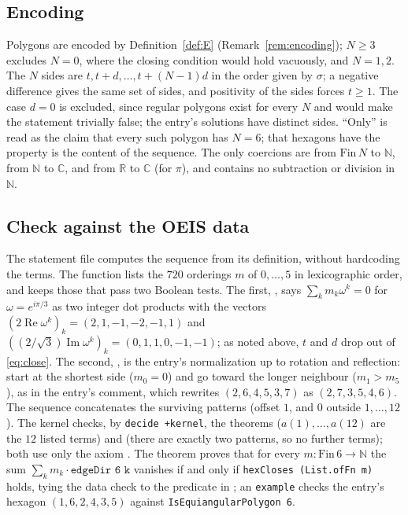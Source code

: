 \documentclass[11pt]{amsart}
\theoremstyle{plain}
\theoremstyle{definition}
\newcommand{\N}{\mathbb{N}}
\newcommand{\C}{\mathbb{C}}
\begin{document}
\subsection*{Encoding}
Polygons are encoded by Definition~\ref{def:E} (Remark~\ref{rem:encoding}); $N\ge3$ excludes $N=0$, where the closing condition would hold vacuously, and $N=1,2$.
The $N$ sides are $t,t+d,\dots,t+(N-1)d$ in the order given by $\sigma$; a negative difference gives the same set of sides, and positivity of the sides forces $t\ge1$.
The case $d=0$ is excluded, since regular polygons exist for every $N$ and would make the statement trivially false; the entry's solutions have distinct sides.
``Only'' is read as the claim that every such polygon has $N=6$; that hexagons have the property is the content of the sequence.
The only coercions are from $\mathrm{Fin}\,N$ to $\N$, from $\N$ to $\C$, and from $\mathbb{R}$ to $\C$ (for $\pi$), and  contains no subtraction or division in $\N$.

\subsection*{Check against the OEIS data}
The statement file computes the sequence from its definition, without hardcoding the terms.
The function  lists the $720$ orderings $m$ of $0,\dots,5$ in lexicographic order, and  keeps those that pass two Boolean tests.
The first, , says $\sum_k m_k\omega^k=0$ for $\omega=e^{i\pi/3}$ as two integer dot products with the vectors $(2\operatorname{Re}\omega^k)_k=(2,1,-1,-2,-1,1)$ and $((2/\sqrt3)\operatorname{Im}\omega^k)_k=(0,1,1,0,-1,-1)$; as noted above, $t$ and $d$ drop out of \eqref{eq:close}.
The second, , is the entry's normalization up to rotation and reflection: start at the shortest side ($m_0=0$) and go toward the longer neighbour ($m_1>m_5$), as in the entry's comment, which rewrites $(2,6,4,5,3,7)$ as $(2,7,3,5,4,6)$.
The sequence  concatenates the surviving patterns (offset $1$, and $0$ outside $1,\dots,12$).
The kernel checks, by \texttt{decide +kernel}, the theorems  ($a(1),\dots,a(12)$ are the $12$ listed terms) and  (there are exactly two patterns, so no further terms); both use only the axiom .
The theorem  proves that for every $m\colon\mathrm{Fin}\,6\to\N$ the sum $\sum_k m_k\cdot\texttt{edgeDir 6 k}$ vanishes if and only if \texttt{hexCloses (List.ofFn m)} holds, tying the data check to the predicate in ; an \texttt{example} checks the entry's hexagon $(1,6,2,4,3,5)$ against \texttt{IsEquiangularPolygon 6}.
\end{document}
